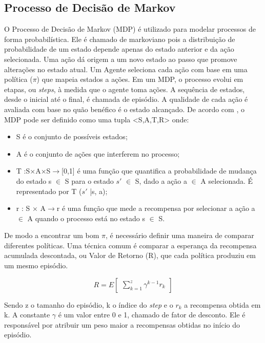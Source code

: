 \subsection{Processo de Decisão de Markov}
O Processo de Decisão de Markov (MDP) é utilizado para modelar processos de forma probabilística. Ele é chamado de markoviano pois a distribuição de probabilidade de um estado depende apenas do estado anterior e da ação selecionada. Uma ação dá origem a um novo estado ao passo que promove alterações no estado atual. Um Agente seleciona cada ação com base em uma política ($\pi$) que mapeia estados a ações. Em um MDP, o processo evolui em etapas, ou \textit{steps}, à medida que o agente toma ações. A sequência de estados, desde o inicial até o final, é chamada de episódio. A qualidade de cada ação é avaliada com base no quão benéfico é o estado alcançado.
De acordo com \cite{MDP}, o MDP pode ser definido como uma tupla 
<S,A,T,R> onde:

\begin{itemize}
   \item S é o conjunto de possíveis estados;
   \item A é o conjunto de ações que interferem no processo;
   \item T :S×A×S$\rightarrow$[0,1] é uma função que quantifica a probabilidade de mudança do estado s $\in$ S para o estado $s'$ $\in$ S, dado a ação a $\in$ A selecionada. É representado por T ($s'$ |s, a);
   \item r : S × A$\rightarrow$r é uma função que mede a recompensa por selecionar a ação a $\in$ A quando o processo está no estado s $\in$ S.
 \end{itemize}

De modo a encontrar um bom $\pi$, é necessário definir uma maneira de comparar diferentes políticas. Uma técnica comum é comparar a esperança da recompensa acumulada descontada, ou Valor de Retorno (R), que cada política produziu em um mesmo episódio.

\begin{equation}
    R = E\begin{bmatrix} \sum_{k=1}^{z} \gamma ^{k-1} r_k \end{bmatrix}
\end{equation}

\noindent
Sendo z o tamanho do episódio, k o índice do \textit{step} e o $r_k$ a recompensa obtida em k. A constante $\gamma$ é um valor entre 0 e 1, chamado de fator de desconto. Ele é responsável por atribuir um peso maior a recompensas obtidas no início do episódio. 

